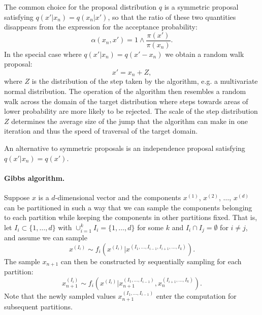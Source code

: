 \documentclass[11pt,a4paper]{report}
\begin{document}

The common choice for the proposal distribution $q$ is a symmetric proposal satisfying $q(x'|x_n) = q(x_n|x')$, so that the ratio of these two quantities disappears from the expression for the acceptance probability:
$$\alpha(x_n, x') = 1 \wedge \frac{\pi(x')}{\pi(x_n)}.$$
In the special case where $q(x'|x_n) = q(x' - x_n)$ we obtain a random walk proposal:
$$x' = x_n + Z,$$
where $Z$ is the distribution of the step taken by the algorithm, e.g. a multivariate normal distribution. The operation of the algorithm then resembles a random walk across the domain of the target distribution where steps towards areas of lower probability are more likely to be rejected. The scale of the step distribution $Z$ determines the average size of the jump that the algorithm can make in one iteration and thus the speed of traversal of the target domain.

An alternative to symmetric proposals is an independence proposal satisfying $q(x'|x_n) = q(x')$.


\paragraph{Gibbs algorithm.} Suppose $x$ is a $d$-dimensional vector and the components $x^{(1)}$, $x^{(2)}$, $\dots$, $x^{(d)}$ can be partitioned in such a way that we can sample the components belonging to each partition while keeping the components in other partitions fixed. That is, let $I_i \subset \{1, \dots, d\}$ with $\cup_{i=1}^k I_i = \{1, \dots, d\}$ for some $k$ and $I_i \cap I_j = \emptyset$ for $i \neq j$, and assume we can sample
$$x^{(I_i)} \sim f_i\left(x^{(I_i)} | x^{(I_1, \dots, I_{i-1}, I_{i+1}, \dots, I_k)}\right).$$
The sample $x_{n+1}$ can then be constructed by sequentially sampling for each partition:
$$x_{n+1}^{(I_i)} \sim f_i\left(x^{(I_i)} | x_{n+1}^{(I_1, \dots, I_{i-1})}, x_n^{(I_{i+1}, \dots, I_k)}\right).$$
Note that the newly sampled values $x_{n+1}^{(I_1, \dots, I_{i-1})}$ enter the computation for subsequent partitions.



\end{document}
